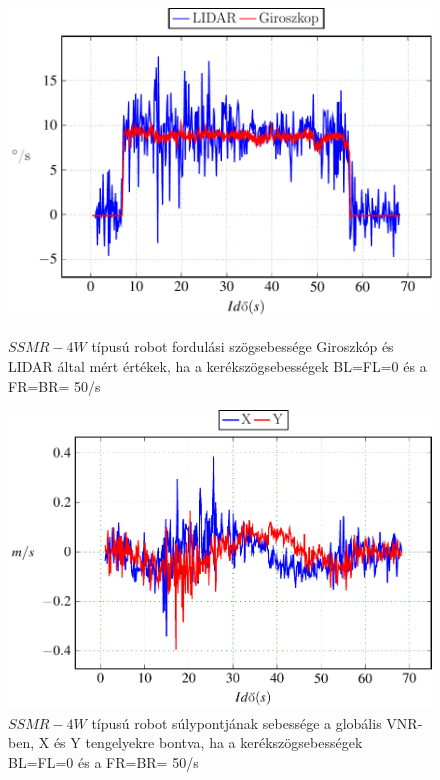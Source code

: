 \begin{figure}[H]
	\begin{center}
  		\label{fig:Left0Right50d}
  		\includegraphics[scale=0.9]{tikz/Left0Right50d.pdf}
  	\end{center}
  \caption{$SSMR-4W$ típusú robot fordulási szögsebessége Giroszkóp és LIDAR által mért értékek, ha a kerékszögsebességek BL=FL=0 és a FR=BR= 50\degree/s}
  \label{fig:Left0Right50d}
\end{figure}


\begin{figure}[H]
	\begin{center}
  		\includegraphics[scale=0.9]{tikz/Left0Right50e.pdf}
    \end{center}
  \caption{$SSMR-4W$ típusú robot súlypontjának sebessége a globális VNR-ben, X és Y tengelyekre bontva, ha a kerékszögsebességek BL=FL=0 és a FR=BR= 50\degree/s}
  \label{fig:Left0Right50e}  
\end{figure}











